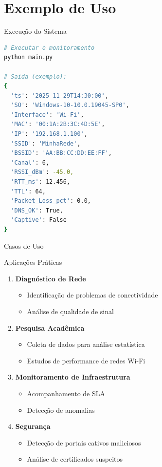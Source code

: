 \documentclass[aspectratio=169]{beamer}
\begin{document}
\section{Exemplo de Uso}

\begin{frame}[fragile]{Execução do Sistema}
\begin{lstlisting}[language=bash, style=pythonstyle]
# Executar o monitoramento
python main.py

# Saida (exemplo):
{
  'ts': '2025-11-29T14:30:00',
  'SO': 'Windows-10-10.0.19045-SP0',
  'Interface': 'Wi-Fi',
  'MAC': '00:1A:2B:3C:4D:5E',
  'IP': '192.168.1.100',
  'SSID': 'MinhaRede',
  'BSSID': 'AA:BB:CC:DD:EE:FF',
  'Canal': 6,
  'RSSI_dBm': -45.0,
  'RTT_ms': 12.456,
  'TTL': 64,
  'Packet_Loss_pct': 0.0,
  'DNS_OK': True,
  'Captive': False
}
\end{lstlisting}
\end{frame}

\begin{frame}{Casos de Uso}
\begin{block}{Aplicações Práticas}
\begin{enumerate}
    \item \textbf{Diagnóstico de Rede}
    \begin{itemize}
        \item Identificação de problemas de conectividade
        \item Análise de qualidade de sinal
    \end{itemize}
    
    \item \textbf{Pesquisa Acadêmica}
    \begin{itemize}
        \item Coleta de dados para análise estatística
        \item Estudos de performance de redes Wi-Fi
    \end{itemize}
    
    \item \textbf{Monitoramento de Infraestrutura}
    \begin{itemize}
        \item Acompanhamento de SLA
        \item Detecção de anomalias
    \end{itemize}
    
    \item \textbf{Segurança}
    \begin{itemize}
        \item Detecção de portais cativos maliciosos
        \item Análise de certificados suspeitos
    \end{itemize}
\end{enumerate}
\end{block}
\end{frame}
\end{document}
